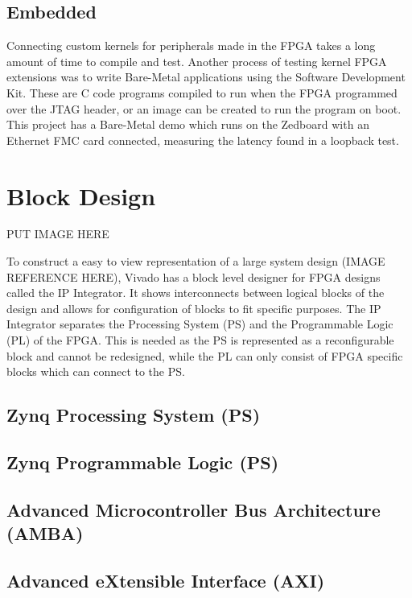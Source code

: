 \subsection{Embedded}

\par Connecting custom kernels for peripherals made in the FPGA takes a long amount of time to compile and test. 
Another process of testing kernel FPGA extensions was to write Bare-Metal applications using the Software 
Development Kit. These are C code programs compiled to run when the FPGA programmed over the JTAG header, or an 
image can be created to run the program on boot. This project has a Bare-Metal demo which runs on the Zedboard 
with an Ethernet FMC card connected, measuring the latency found in a loopback test. 

\section{Block Design}

\par PUT IMAGE HERE

\par To construct a easy to view representation of a large system design (IMAGE REFERENCE HERE), Vivado has a block level designer for
FPGA designs called the IP Integrator. It shows interconnects between logical blocks of the design and allows for 
configuration of blocks to fit specific purposes. The IP Integrator separates the Processing System (PS) and the 
Programmable Logic (PL) of the FPGA. This is needed as the PS is represented as a reconfigurable block and cannot be redesigned, while
the PL can only consist of FPGA specific blocks which can connect to the PS. 

\subsection{Zynq Processing System (PS)}
\subsection{Zynq Programmable Logic (PS)}
\subsection{Advanced Microcontroller Bus Architecture (AMBA)}
\subsection{Advanced eXtensible Interface (AXI)}
